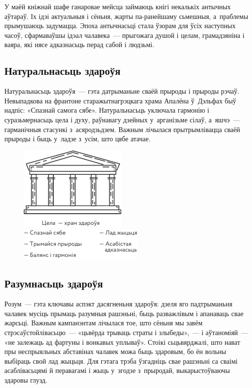 У маёй кніжнай шафе ганаровае мейсца займаюць кнігі некалькіх антычных аўтараў. Іх ідэі актуальныя і сёньня, жарты па-ранейшаму сьмешныя, а~праблемы прымушаюць задумацца. Эпоха антычнасьці стала ўзорам для ўсіх наступных часоў, сфармаваўшы ідэал чалавека~--- прыгожага душой і целам, грамадзяніна і ваяра, які нясе адказнасьць перад сабой і людзьмі. 


\subsection*{Натуральнасьць здароўя} 

Натуральнасьць здароўя~--- гэта датрыманьне сваёй прыроды і прыроды рэчаў. Невыпадкова на франтоне старажытнагрэцкага храма Апалёна ў~Дэльфах быў надпіс: «Спазнай самога сябе». Натуральнасьць уключала гармонію і суразьмернасьць цела і духу, раўнавагу дзейных у~арганізьме сілаў, а~яшчэ~--- гарманічныя стасункі з~асяродзьдзем. Важным лічылася прытрымлівацца сваёй прыроды і быць у~ладзе з~усім, што цябе атачае.

\begin{figure}[htb!]
  \centering
  \includegraphics[scale=1.5]{willpower/ch1/3.pdf}
  \medskip

  \includegraphics[scale=1.5]{willpower/ch1/4.pdf}
\end{figure}

\subsection*{Разумнасьць здароўя} 

Розум~--- гэта ключавы аспэкт дасягненьня здароўя: дзеля яго падтрыманьня чалавек мусіць прымаць разумныя рашэньні, быць разважлівым і апанаваць свае жарсьці. Важным кампанэнтам лічылася тое, што сёньня мы завём стрэсаўстойлівасьцю~--- «цьвёрда трываць страты і злыбеды»,~--- і аўтаноміяй~--- «не залежаць ад фартуны і вонкавых уплываў». Стоікі сьцьвярджалі, што нават пры неспрыяльных абставінах чалавек можа быць здаровым, бо ён вольны выбіраць свой лад жыцьця. Для гэтага трэба ўзгадніць свае рашэньні са сваімі асаблівасьцямі й перавагамі і жыць у~згодзе з~прыродай, выкарыстоўваючы здаровы глузд.

